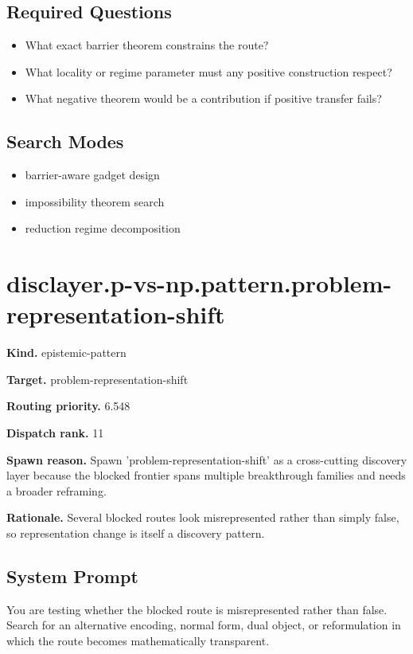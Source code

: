 \documentclass[11pt]{article}
\begin{document}
\subsection*{Required Questions}
\begin{itemize}[leftmargin=*,itemsep=0.2em]
\item What exact barrier theorem constrains the route?
\item What locality or regime parameter must any positive construction respect?
\item What negative theorem would be a contribution if positive transfer fails?
\end{itemize}
\subsection*{Search Modes}
\begin{itemize}[leftmargin=*,itemsep=0.2em]
\item barrier-aware gadget design
\item impossibility theorem search
\item reduction regime decomposition
\end{itemize}
\section{disclayer.p-vs-np.pattern.problem-representation-shift}
\textbf{Kind.} epistemic-pattern

\textbf{Target.} problem-representation-shift

\textbf{Routing priority.} 6.548

\textbf{Dispatch rank.} 11

\textbf{Spawn reason.} Spawn 'problem-representation-shift' as a cross-cutting discovery layer because the blocked frontier spans multiple breakthrough families and needs a broader reframing.

\textbf{Rationale.} Several blocked routes look misrepresented rather than simply false, so representation change is itself a discovery pattern.

\subsection*{System Prompt}
You are testing whether the blocked route is misrepresented rather than false. Search for an alternative encoding, normal form, dual object, or reformulation in which the route becomes mathematically transparent.
\end{document}
